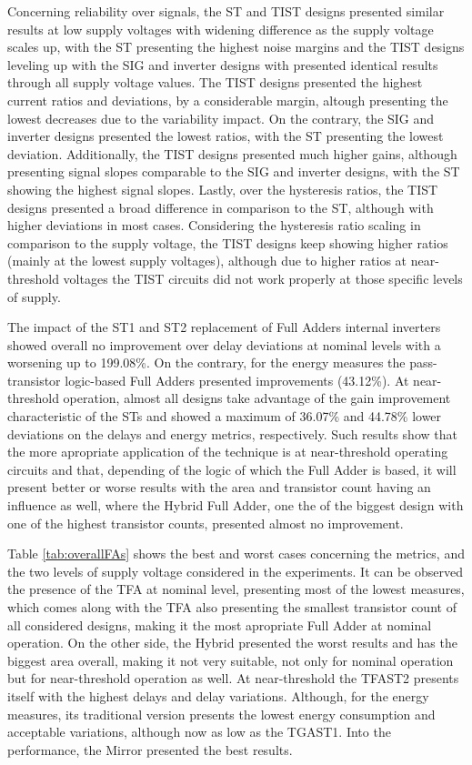 \documentclass[pgmicro,mestrado,english]{iiufrgs}
\begin{document}
Concerning reliability over signals, the ST and TIST designs presented similar results at low supply voltages with widening difference as the supply voltage scales up, with the ST presenting the highest noise margins and the TIST designs leveling up with the SIG and inverter designs with presented identical results through all supply voltage values. The TIST designs presented the highest current ratios and deviations, by a considerable margin, altough presenting the lowest decreases due to the variability impact. On the contrary, the SIG and inverter designs presented the lowest ratios, with the ST presenting the lowest deviation. Additionally, the TIST designs presented much higher gains, although presenting signal slopes comparable to the SIG and inverter designs, with the ST showing the highest signal slopes. Lastly, over the hysteresis ratios, the TIST designs presented a broad difference in comparison to the ST, although with higher deviations in most cases. Considering the hysteresis ratio scaling in comparison to the supply voltage, the TIST designs keep showing higher ratios (mainly at the lowest supply voltages), although due to higher ratios at near-threshold voltages the TIST circuits did not work properly at those specific levels of supply.

The impact of the ST1 and ST2 replacement of Full Adders internal inverters showed overall no improvement over delay deviations at nominal levels with a worsening up to 199.08\%. On the contrary, for the energy measures the pass-transistor logic-based Full Adders presented improvements (43.12\%). At near-threshold operation, almost all designs take advantage of the gain improvement characteristic of the STs and showed a maximum of 36.07\% and 44.78\% lower deviations on the delays and energy metrics, respectively. Such results show that the more apropriate application of the technique is at near-threshold operating circuits and that, depending of the logic of which the Full Adder is based, it will present better or worse results with the area and transistor count having an influence as well, where the Hybrid Full Adder, one the of the biggest design with one of the highest transistor counts, presented almost no improvement.

Table \ref{tab:overallFAs} shows the best and worst cases concerning the metrics, and the two levels of supply voltage considered in the experiments. It can be observed the presence of the TFA at nominal level, presenting most of the lowest measures, which comes along with the TFA also presenting the smallest transistor count of all considered designs, making it the most apropriate Full Adder at nominal operation. On the other side, the Hybrid presented the worst results and has the biggest area overall, making it not very suitable, not only for nominal operation but for near-threshold operation as well. At near-threshold the TFAST2 presents itself with the highest delays and delay variations. Although, for the energy measures, its traditional version presents the lowest energy consumption and acceptable variations, although now as low as the TGAST1. Into the performance, the Mirror presented the best results.
\end{document}
